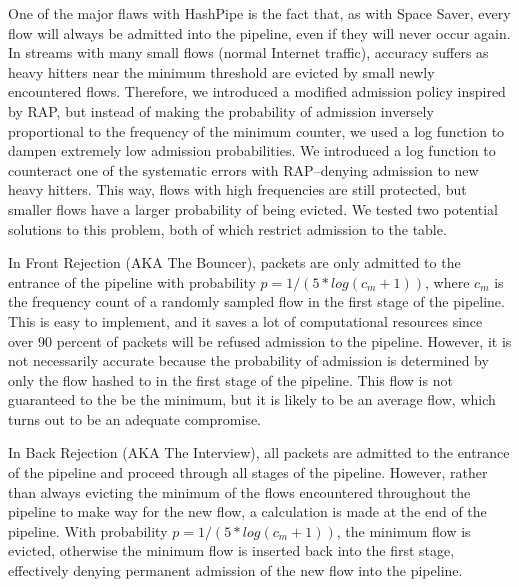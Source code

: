 One of the major flaws with HashPipe is the fact that, as with Space Saver, every flow will always be admitted into the pipeline, even if they will never occur again. In streams with many small flows (normal Internet traffic), accuracy suffers as heavy hitters near the minimum threshold are evicted by small newly encountered flows. Therefore, we introduced a modified admission policy inspired by RAP, but instead of making the probability of admission inversely proportional to the frequency of the minimum counter, we used a log function to dampen extremely low admission probabilities. We introduced a log function to counteract one of the systematic errors with RAP--denying admission to new heavy hitters. This way, flows with high frequencies are still protected, but smaller flows have a larger probability of being evicted. We tested two potential solutions to this problem, both of which restrict admission to the table. 

In Front Rejection (AKA The Bouncer), packets are only admitted to the entrance of the pipeline with probability $p = 1 / (5*log(c_m + 1))$, where $c_m$ is the frequency count of a randomly sampled flow in the first stage of the pipeline. This is easy to implement, and it saves a lot of computational resources since over 90 percent of packets will be refused admission to the pipeline. However, it is not necessarily accurate because the probability of admission is determined by only the flow hashed to in the first stage of the pipeline. This flow is not guaranteed to the be the minimum, but it is likely to be an average flow, which turns out to be an adequate compromise. 

In Back Rejection (AKA The Interview), all packets are admitted to the entrance of the pipeline and proceed through all stages of the pipeline. However, rather than always evicting the minimum of the flows encountered throughout the pipeline to make way for the new flow, a calculation is made at the end of the pipeline. With probability $p = 1 / (5*log(c_m + 1))$, the minimum flow is evicted, otherwise the minimum flow is inserted back into the first stage, effectively denying permanent admission of the new flow into the pipeline. 

